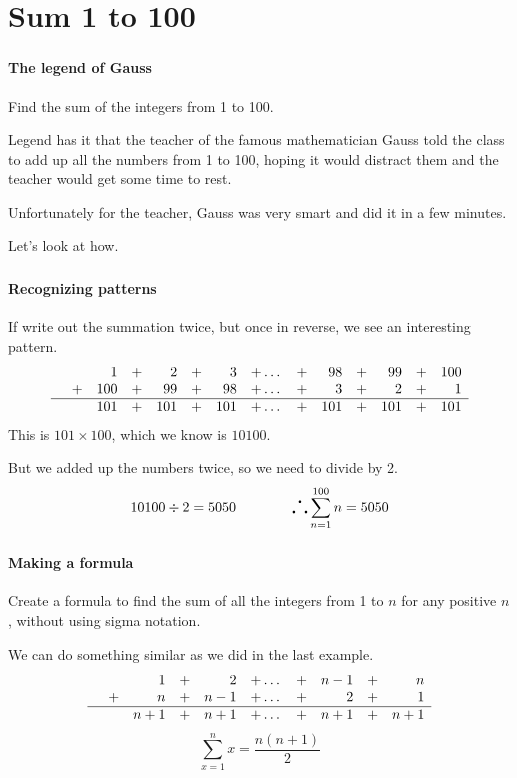 	\section{Sum 1 to 100}
	\begin{frame}
		\frametitle{\secname}
		\framesubtitle{The legend of Gauss}
		\begin{example}
			Find the sum of the integers from 1 to 100.
		\end{example}
		Legend has it that the teacher of the famous mathematician Gauss told the class to add up all the numbers from 1 to 100, hoping it would distract them and the teacher would get some time to rest.

		Unfortunately for the teacher, Gauss was very smart and did it in a few minutes.

		Let's look at how.
	\end{frame}
	\begin{frame}
		\frametitle{\secname}
		\framesubtitle{Recognizing patterns}
		If write out the summation twice, but once in reverse, we see an interesting pattern.
		\begin{equation*}
			\begin{array}{lrrrrrrrrrrrrrrrrrrrrr}
				&    &1 &+  &2  &+  &3 &+  \dots &+ &98  &+ &99  &+ &100\\
				&+ &100 &+ &99  &+ &98 &+  \dots &+  &3  &+  &2  &+ &1\\\hline
				&  &101 &+ &101 &+ &101 &+ \dots &+ &101 &+ &101 &+ &101
			\end{array}
		\end{equation*}
		This is $101 \times 100$, which we know is $10100$.

		But we added up the numbers twice, so we need to divide by 2.
		\[10100 \div 2 = 5050 \qquad\qquad \text{\LARGE$\therefore$}\sum_{n=1}^{100}n = 5050\]
	\end{frame}
	\begin{frame}
		\frametitle{\secname}
		\framesubtitle{Making a formula}
		\begin{example}
			Create a formula to find the sum of all the integers from 1 to $n$ for any positive $n$, without using sigma notation.
		\end{example}
		\pause
		We can do something similar as we did in the last example.
		\pause
		\begin{equation*}
			\begin{array}{lrrrrrrrrrrrrrrrrrrrrr}
				&    &1 &+   &2 &+ \dots &+ &n-1 &+ &n\\
				&+   &n &+ &n-1 &+ \dots &+   &2 &+ &1\\\hline
				&  &n+1 &+ &n+1 &+ \dots &+ &n+1 &+ &n+1
			\end{array}
		\end{equation*}
		\pause
		\[\sum_{x=1}^{n}x = \frac{n(n+1)}{2}\]
	\end{frame}

